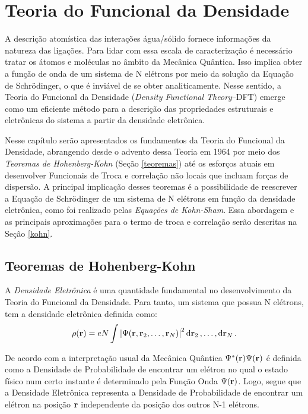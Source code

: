 \chapter{Teoria do Funcional da Densidade\label{cap:denf}}

A descrição atomística das interações água/sólido fornece informações da natureza das ligações. Para lidar com essa escala de caracterização é necessário tratar os átomos e moléculas no âmbito da Mecânica Quântica. Isso implica obter a função de onda de um sistema de N elétrons por meio da solução da Equação de Schr\"{o}dinger, o que é inviável de se obter analiticamente. Nesse sentido, a Teoria do Funcional da Densidade (\textit{Density Functional Theory}--DFT) emerge como um eficiente método para a descrição das propriedades estruturais e eletrônicas do sistema a partir da densidade eletrônica.

Nesse capítulo serão apresentados os fundamentos da Teoria do Funcional da Densidade, abrangendo desde o advento dessa Teoria em 1964 por meio dos \textit{Teoremas de Hohenberg-Kohn} (Seção \ref{teoremas}) até os esforços atuais em desenvolver Funcionais de Troca e correlação não locais que incluam forças de dispersão. A principal implicação desses teoremas é a possibilidade de reescrever a Equação de  Schr\"{o}dinger de um sistema de N elétrons em função da densidade eletrônica, como foi realizado pelas \textit{Equações de Kohn-Sham}. Essa abordagem e as principais aproximações para o termo de troca e correlação serão descritas na Seção \ref{kohn}.


\section{Teoremas de Hohenberg-Kohn\label{teoremas}}

A \textit{Densidade Eletrônica} é uma quantidade fundamental no desenvolvimento da Teoria do Funcional da Densidade. Para tanto, um sistema que possua N elétrons, tem a densidade eletrônica definida como:
\begin{equation}\label{eq:rho}
	\rho(\vb{r})=eN\int\abs{\Psi(\vb{r},\vb{r}_2,\ldots,\vb{r}_N)}^2 \dd{\vb{r}_2},\ldots,\dd{\vb{r}_N}. 
\end{equation}  

De acordo com a interpretação usual da Mecânica Quântica $ \Psi^{\ast}(\vb{r})\Psi(\vb{r}) $ é definida como a Densidade de Probabilidade de encontrar um elétron no qual o estado físico num certo instante é determinado pela Função Onda $ \Psi(\vb{r}) $. Logo, segue que a Densidade Eletrônica representa a Densidade de Probabilidade de encontrar um elétron na posição $ \vb{r} $ independente da posição dos outros N-1 elétrons. 

